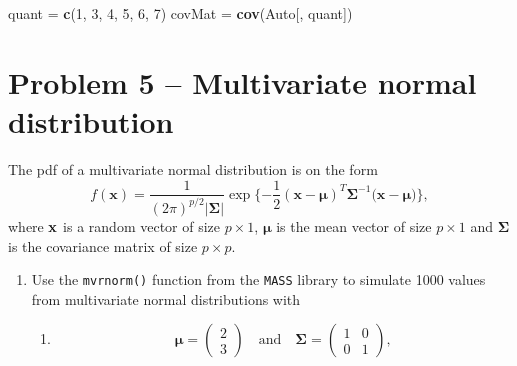 \documentclass[]{article}
\newenvironment{Shaded}{\begin{snugshade}}{\end{snugshade}}
\newcommand{\KeywordTok}[1]{\textcolor[rgb]{0.13,0.29,0.53}{\textbf{#1}}}
\newcommand{\DecValTok}[1]{\textcolor[rgb]{0.00,0.00,0.81}{#1}}
\newcommand{\StringTok}[1]{\textcolor[rgb]{0.31,0.60,0.02}{#1}}
\newcommand{\NormalTok}[1]{#1}
\providecommand{\tightlist}{%
  \setlength{\itemsep}{0pt}\setlength{\parskip}{0pt}}
\begin{document}
\begin{Shaded}
\begin{Highlighting}[]
\NormalTok{quant =}\StringTok{ }\KeywordTok{c}\NormalTok{(}\DecValTok{1}\NormalTok{, }\DecValTok{3}\NormalTok{, }\DecValTok{4}\NormalTok{, }\DecValTok{5}\NormalTok{, }\DecValTok{6}\NormalTok{, }\DecValTok{7}\NormalTok{)}
\NormalTok{covMat =}\StringTok{ }\KeywordTok{cov}\NormalTok{(Auto[, quant])}
\end{Highlighting}
\end{Shaded}

\section{Problem 5 -- Multivariate normal
distribution}\label{problem-5-multivariate-normal-distribution}

The pdf of a multivariate normal distribution is on the form
\[ f(\boldsymbol{x}) = \frac{1}{(2\pi)^{p/2}|\boldsymbol{\Sigma|}} \exp\{-\frac{1}{2}(\boldsymbol{x-\mu})^T\boldsymbol{\Sigma}^{-1}(\boldsymbol{x-\mu)}\},\]
where \(\bf{x}\) is a random vector of size \(p\times 1\),
\(\boldsymbol{\mu}\) is the mean vector of size \(p\times 1\) and
\(\boldsymbol{\Sigma}\) is the covariance matrix of size \(p\times p\).

\begin{enumerate}
\def\labelenumi{\alph{enumi})}
\item
  Use the \texttt{mvrnorm()} function from the \texttt{MASS} library to
  simulate 1000 values from multivariate normal distributions with

  \begin{enumerate}
  \def\labelenumii{\roman{enumii})}
  \tightlist
  \item
    \[ \boldsymbol{\mu} = \begin{pmatrix}
    2 \\
    3 
    \end{pmatrix} \quad \text{and} \quad \boldsymbol{\Sigma} = \begin{pmatrix}
    1 & 0\\
    0 & 1
    \end{pmatrix},\]
  \end{enumerate}
\end{enumerate}
\end{document}
